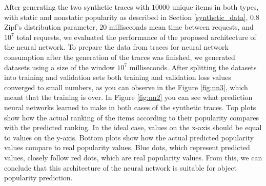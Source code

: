 After generating the two synthetic traces with $ 10000 $ unique items in both types, with static and nonstatic popularity as described in Section \ref{synthetic_data}, $ 0.8 $ Zipf's distribution parameter, $ 20 $ milliseconds mean time between requests, and $ 10^7 $ total requests, we evaluated the performance of the proposed architecture of the neural network. To prepare the data from traces for neural network consumption after the generation of the traces was finished, we generated datasets using a size of the window $ 10^7 $ milliseconds. After splitting the datasets into training and validation sets both training and validation loss values converged to small numbers, as you can observe in the Figure \ref{fig:nn3}, which meant that the training is over. In Figure \ref{fig:nn2} you can see what prediction neural networks learned to make in both cases of the synthetic traces. Top plots show how the actual ranking of the items according to their popularity compares with the predicted ranking. In the ideal case, values on the x-axis should be equal to values on the y-axis. Bottom plots show how the actual predicted popularity values compare to real popularity values. Blue dots, which represent predicted values, closely follow red dots, which are real popularity values. From this, we can conclude that this architecture of the neural network is suitable for object popularity prediction.

